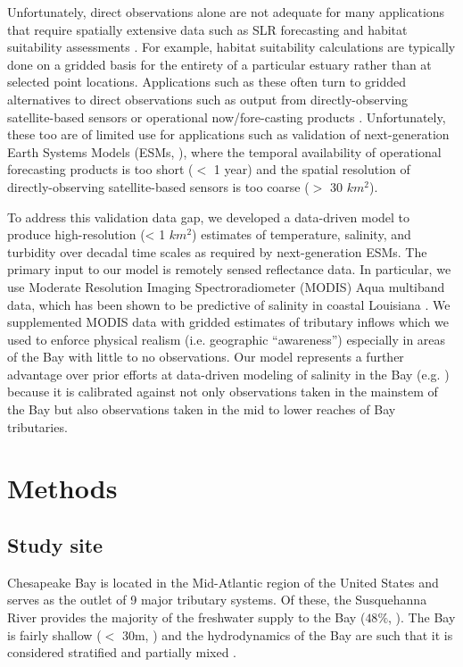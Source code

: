 \documentclass{article}
\begin{document}
Unfortunately, direct observations alone are not adequate for many applications that require spatially extensive data such as SLR forecasting and habitat suitability assessments \citep{hoodChesapeakeBayProgram2021}. For example, habitat suitability calculations are typically done on a gridded basis for the entirety of a particular estuary rather than at selected point locations. Applications such as these often turn to gridded alternatives to direct observations such as output from directly-observing satellite-based sensors \citep{foreCombinedActivePassive2016} or operational now/fore-casting products \citep{lanerolle2011second}. Unfortunately, these too are of limited use for applications such as validation of next-generation Earth Systems Models (ESMs, \citet{golazDOEE3SMModel2022}), where the temporal availability of operational forecasting products is too short ($<$ 1 year) and the spatial resolution of directly-observing satellite-based sensors is too coarse ($>$ 30 $km^2$).

To address this validation data gap, we developed a data-driven model to produce high-resolution (< 1 $km^2$) estimates of temperature, salinity, and turbidity over decadal time scales as required by next-generation ESMs. The primary input to our model is remotely sensed reflectance data. In particular, we use Moderate Resolution Imaging Spectroradiometer (MODIS) Aqua multiband data, which has been shown to be predictive of salinity in coastal Louisiana \citep{wangDevelopmentMODISData2018}. We supplemented MODIS data with gridded estimates of tributary inflows which we used to enforce physical realism (i.e. geographic “awareness”) especially in areas of the Bay with little to no observations. Our model represents a further advantage over prior efforts at data-driven modeling of salinity in the Bay (e.g. \citet{vogelAssessingSatelliteSea2016}) because it is calibrated against not only observations taken in the mainstem of the Bay but also observations taken in the mid to lower reaches of Bay tributaries.


\section{Methods}

\subsection{Study site}

Chesapeake Bay is located in the Mid-Atlantic region of the United States and serves as the outlet of 9 major tributary systems. Of these, the Susquehanna River provides the majority of the freshwater supply to the Bay (\texttildelow$48\%$, \citet{xuClimateForcingSalinity2012}). The Bay is fairly shallow ($<$ 30m, \citet{murphyComparisonSpatialInterpolation2010}) and the hydrodynamics of the Bay are such that it is considered stratified and partially mixed \citep{xuClimateForcingSalinity2012}.
\end{document}
